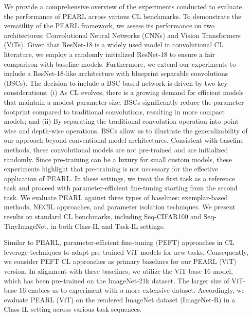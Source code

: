 \documentclass[10pt]{article} %
\begin{document}
We provide a comprehensive overview of the experiments conducted to evaluate the performance of PEARL across various CL benchmarks. To demonstrate the versatility of the PEARL framework, we assess its performance on two architectures: Convolutional Neural Networks (CNNs) and Vision Transformers (ViTs). Given that ResNet-18 is a widely used model in convolutional CL literature, we employ a randomly initialized ResNet-18 to ensure a fair comparison with baseline models. Furthermore, we extend our experiments to include a ResNet-18-like architecture with blueprint separable convolutions (BSCs). The decision to include a BSC-based network is driven by two key considerations: (i) As CL evolves, there is a growing demand for efficient models that maintain a modest parameter size. BSCs significantly reduce the parameter footprint compared to traditional convolutions, resulting in more compact models; and (ii) By separating the traditional convolution operation into point-wise and depth-wise operations, BSCs allow us to illustrate the generalizability of our approach beyond conventional model architectures. Consistent with baseline methods, these convolutional models are not pre-trained and are initialized randomly. Since pre-training can be a luxury for small custom models, these experiments highlight that pre-training is not necessary for the effective application of PEARL. In these settings, we treat the first task as a reference task and proceed with parameter-efficient fine-tuning starting from the second task. We evaluate PEARL against three types of baselines: exemplar-based methods, NECIL approaches, and parameter isolation techniques. We present results on standard CL benchmarks, including Seq-CIFAR100 and Seq-TinyImageNet, in both Class-IL and Task-IL settings.

Similar to PEARL, parameter-efficient fine-tuning (PEFT) approaches in CL leverage techniques to adapt pre-trained ViT models for new tasks. Consequently, we consider PEFT CL approaches as primary baselines for our PEARL (ViT) version. In alignment with these baselines, we utilize the ViT-base-16 model, which has been pre-trained on the ImageNet-21k dataset. The larger size of ViT-base-16 enables us to experiment with a more extensive dataset. Accordingly, we evaluate PEARL (ViT) on the rendered ImageNet dataset (ImageNet-R) in a Class-IL setting across various task sequences. 
\end{document}
